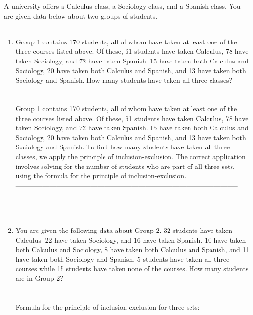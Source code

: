 \documentclass{amsart}
\theoremstyle{definition}
\theoremstyle{Exercise}
\theoremstyle{remark}
\theoremstyle{rule}
\numberwithin{equation}{section}
\begin{document}
A university offers a Calculus class, a Sociology class, and a Spanish class. You are given data below about two groups of students.\\\\
     \begin{enumerate}[label=(\roman*)]
     \item Group 1 contains 170 students, all of whom have taken at least one of the three courses listed above. Of these, 61 students have taken Calculus, 78 have taken Sociology, and 72 have taken Spanish. 15 have taken both Calculus and Sociology, 20 have taken both Calculus and Spanish, and 13 have taken both Sociology and Spanish. How many students have taken all three classes?\\\\
--------------------------------------------------------------------------------------------------\\
Group 1 contains 170 students, all of whom have taken at least one of the three courses listed above. Of these, 61 students have taken Calculus, 78 have taken Sociology, and 72 have taken Spanish. 15 have taken both Calculus and Sociology, 20 have taken both Calculus and Spanish, and 13 have taken both Sociology and Spanish. To find how many students have taken all three classes, we apply the principle of inclusion-exclusion. The correct application involves solving for the number of students who are part of all three sets, using the formula for the principle of inclusion-exclusion.\\
--------------------------------------------------------------------------------------------------\\
\\\\\
\item You are given the following data about Group 2. 32 students have taken Calculus, 22 have taken Sociology, and 16 have taken Spanish. 10 have taken both Calculus and Sociology, 8 have taken both Calculus and Spanish, and 11 have taken both Sociology and Spanish. 5 students have taken all three courses while 15 students have taken none of the courses. How many students are in Group 2?\\\\
--------------------------------------------------------------------------------------------------\\
Formula for the principle of inclusion-exclusion for three sets:\\

\end{enumerate}
\end{document}

